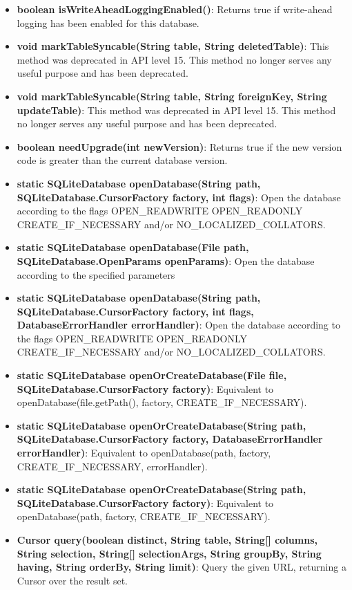 \documentclass{report}
\begin{document}
\begin{itemize}
\begin{itemize}
\begin{itemize}
                \item \textbf{boolean	isWriteAheadLoggingEnabled()}: Returns true if write-ahead logging has been enabled for this database.
                \item \textbf{void	markTableSyncable(String table, String deletedTable)}: This method was deprecated in API level 15. This method no longer serves any useful purpose and has been deprecated.
                \item \textbf{void	markTableSyncable(String table, String foreignKey, String updateTable)}: This method was deprecated in API level 15. This method no longer serves any useful purpose and has been deprecated.
                \item \textbf{boolean	needUpgrade(int newVersion)}: Returns true if the new version code is greater than the current database version.
                \item \textbf{static SQLiteDatabase	openDatabase(String path, SQLiteDatabase.CursorFactory factory, int flags)}: Open the database according to the flags OPEN\_READWRITE OPEN\_READONLY CREATE\_IF\_NECESSARY and/or NO\_LOCALIZED\_COLLATORS.
                \item \textbf{static SQLiteDatabase	openDatabase(File path, SQLiteDatabase.OpenParams openParams)}: Open the database according to the specified parameters
                \item \textbf{static SQLiteDatabase	openDatabase(String path, SQLiteDatabase.CursorFactory factory, int flags, DatabaseErrorHandler errorHandler)}: Open the database according to the flags OPEN\_READWRITE OPEN\_READONLY CREATE\_IF\_NECESSARY and/or NO\_LOCALIZED\_COLLATORS.
                \item \textbf{static SQLiteDatabase	openOrCreateDatabase(File file, SQLiteDatabase.CursorFactory factory)}: Equivalent to openDatabase(file.getPath(), factory, CREATE\_IF\_NECESSARY).
                \item \textbf{static SQLiteDatabase	openOrCreateDatabase(String path, SQLiteDatabase.CursorFactory factory, DatabaseErrorHandler errorHandler)}: Equivalent to openDatabase(path, factory, CREATE\_IF\_NECESSARY, errorHandler).
                \item \textbf{static SQLiteDatabase	openOrCreateDatabase(String path, SQLiteDatabase.CursorFactory factory)}: Equivalent to openDatabase(path, factory, CREATE\_IF\_NECESSARY).
                \item \textbf{Cursor	query(boolean distinct, String table, String[] columns, String selection, String[] selectionArgs, String groupBy, String having, String orderBy, String limit)}: Query the given URL, returning a Cursor over the result set.

\end{itemize}
\end{itemize}
\end{itemize}
\end{document}
